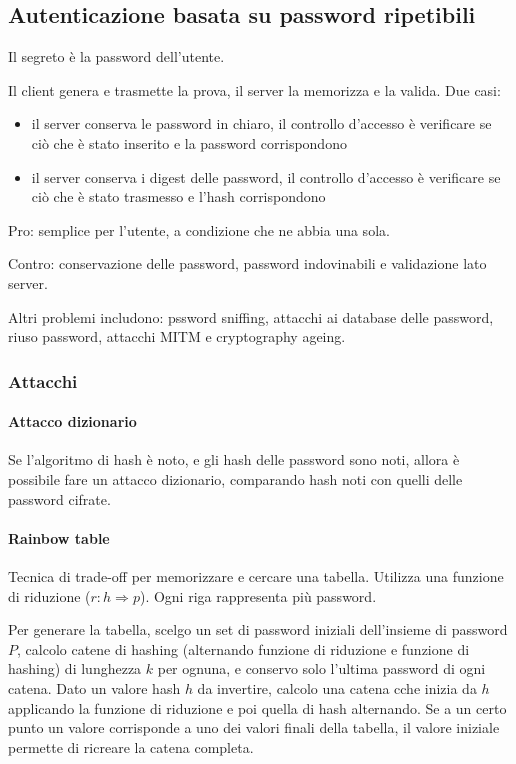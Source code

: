 \documentclass[11pt]{article}
\begin{document}
\subsection{Autenticazione basata su password ripetibili}
Il segreto è la password dell'utente. 

Il client genera e trasmette la prova, il server la memorizza e la valida. Due casi:
\begin{itemize}
    \item il server conserva le password in chiaro, il controllo d'accesso è verificare se ciò che è stato inserito e la 
    password corrispondono 
    \item il server conserva i digest delle password, il controllo d'accesso è verificare se ciò che è stato trasmesso e 
    l'hash corrispondono 
\end{itemize}
Pro: semplice per l'utente, a condizione che ne abbia una sola.

Contro: conservazione delle password, password indovinabili e validazione lato server.

Altri problemi includono: pssword sniffing, attacchi ai database delle password, riuso password, attacchi MITM e cryptography
ageing.
\subsubsection{Attacchi}
\paragraph*{Attacco dizionario}
Se l'algoritmo di hash è noto, e gli hash delle password sono noti, allora è possibile fare un attacco dizionario, comparando
hash noti con quelli delle password cifrate.
\paragraph*{Rainbow table}
Tecnica di trade-off per memorizzare e cercare una tabella. Utilizza una funzione di riduzione ($r:h\Rightarrow p$).
Ogni riga rappresenta più password.

Per generare la tabella, scelgo un set di password iniziali dell'insieme di password $P$, calcolo catene di hashing (alternando 
funzione di riduzione e funzione di hashing) di lunghezza $k$ per ognuna, e conservo solo l'ultima password di ogni catena.
Dato un valore hash $h$ da invertire, calcolo una catena cche inizia da $h$ applicando la funzione di riduzione e poi quella 
di hash alternando. Se a un certo punto un valore corrisponde a uno dei valori finali della tabella, il valore iniziale 
permette di ricreare la catena completa.
\end{document}
